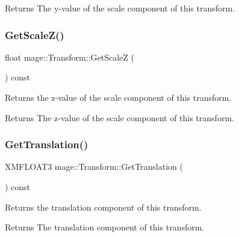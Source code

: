 \begin{DoxyReturn}{Returns}
The y-\/value of the scale component of this transform. 
\end{DoxyReturn}
\hypertarget{structmage_1_1_transform_a9e8f3a4ec330e6f4c9e1a9607daf30fa}{}\label{structmage_1_1_transform_a9e8f3a4ec330e6f4c9e1a9607daf30fa} 
\subsubsection{\texorpdfstring{Get\+Scale\+Z()}{GetScaleZ()}}
{\footnotesize\ttfamily float mage\+::\+Transform\+::\+Get\+ScaleZ (\begin{DoxyParamCaption}{ }\end{DoxyParamCaption}) const}

Returns the z-\/value of the scale component of this transform.

\begin{DoxyReturn}{Returns}
The z-\/value of the scale component of this transform. 
\end{DoxyReturn}
\hypertarget{structmage_1_1_transform_aca74308060f244adf137676e79a9f6e5}{}\label{structmage_1_1_transform_aca74308060f244adf137676e79a9f6e5} 
\subsubsection{\texorpdfstring{Get\+Translation()}{GetTranslation()}}
{\footnotesize\ttfamily X\+M\+F\+L\+O\+A\+T3 mage\+::\+Transform\+::\+Get\+Translation (\begin{DoxyParamCaption}{ }\end{DoxyParamCaption}) const}

Returns the translation component of this transform.

\begin{DoxyReturn}{Returns}
The translation component of this transform. 
\end{DoxyReturn}
\hypertarget{structmage_1_1_transform_a4f246a50de8bdfd1bd9dd8e07b7a8c01}{}\label{structmage_1_1_transform_a4f246a50de8bdfd1bd9dd8e07b7a8c01} 
